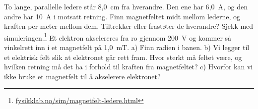 \documentclass[11pt]{article}
\begin{document}
\begin{oppgaveliste}
\svar
\oppgave {}To lange, parallelle ledere står 8,0~cm fra hverandre. Den ene har 6,0~A, og den andre har 10~A i motsatt retning. Finn magnetfeltet midt mellom lederne, og kraften per meter mellom dem. Tiltrekker eller frastøter de hverandre? Sjekk med simuleringen.\footnote{\url{fysikklab.no/sim/magnetfelt-ledere.html}}
\svar
\oppgave {}Et elektron akselereres fra ro gjennom 200~V og kommer så vinkelrett inn i et magnetfelt på 1,0~mT. a) Finn radien i banen. b) Vi legger til et elektrisk felt slik at elektronet går rett fram. Hvor sterkt må feltet være, og hvilken retning må det ha i forhold til kraften fra magnetfeltet? c) Hvorfor kan vi ikke bruke et magnetfelt til å akselerere elektronet?
\svar
\end{oppgaveliste}
\end{document}

